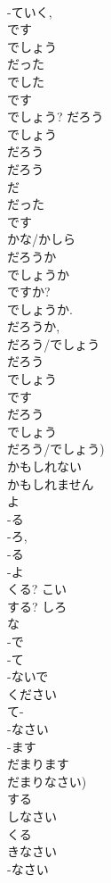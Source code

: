 \documentclass[8pt]{extreport}
\begin{document}
\begin{CJK}{UTF8}{min}
\\	-ていく, 
\\	です 
\\	でしょう 
\\	だった 
\\	でした	
\\	です 
\\	でしょう?	だろう	
\\	でしょう 
\\	だろう 
\\	だろう 
\\	だ
\\	だった
\\	です 
\\	かな/かしら 
\\	だろうか 
\\	でしょうか	
\\	ですか?	
\\	でしょうか. 
\\	だろうか, 
\\	だろう/でしょう 
\\	だろう 
\\	でしょう 
\\	です 
\\	だろう 
\\	でしょう	
\\	だろう/でしょう)
\\	かもしれない 
\\	かもしれません 
\\	よ	
\\	-る 
\\	-ろ, 
\\	-る 
\\	-よ	
\\	くる?	こい	
\\	する?	しろ	
\\	な 
\\	-で 
\\	-て 
\\	-ないで 
\\	ください 
\\	て-
\\	-なさい 
\\	-ます
\\	だまります 
\\	だまりなさい)
\\	する 
\\	しなさい 
\\	くる 
\\	きなさい 
\\	-なさい 

\end{CJK}
\end{document}
